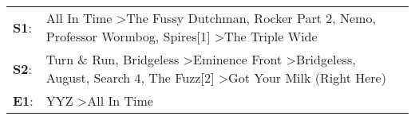 \begin{supertabular}{p{0.03\textwidth}p{0.92\textwidth}}
 \textbf{S1}:  &                                                    All In Time\textsuperscript{} \textgreater \enspace The Fussy Dutchman\textsuperscript{}, \enspace Rocker Part 2\textsuperscript{}, \enspace Nemo\textsuperscript{}, \enspace Professor Wormbog\textsuperscript{}, \enspace Spires[1]\textsuperscript{} \textgreater \enspace The Triple Wide\textsuperscript{}  \enspace  \\
 \textbf{S2}:  &  Turn \& Run\textsuperscript{}, \enspace Bridgeless\textsuperscript{} \textgreater \enspace Eminence Front\textsuperscript{} \textgreater \enspace Bridgeless\textsuperscript{}, \enspace August\textsuperscript{}, \enspace Search 4\textsuperscript{}, \enspace The Fuzz[2]\textsuperscript{} \textgreater \enspace Got Your Milk (Right Here)\textsuperscript{}  \enspace  \\
 \textbf{E1}:  &                                                                                                                                                                                                                                                                                          YYZ\textsuperscript{} \textgreater \enspace All In Time\textsuperscript{}  \enspace  \\
\end{supertabular}
